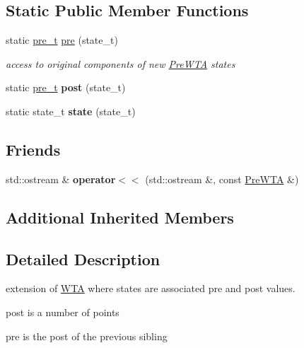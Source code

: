 \subsection*{Static Public Member Functions}
\begin{DoxyCompactItemize}
\item 
static \mbox{\hyperlink{group__general_ga092fe8b972dfa977c2a0886720a7731e}{pre\+\_\+t}} \mbox{\hyperlink{group__schemata_gaab30a1faaa381ecfabd705a8c12d179b}{pre}} (state\+\_\+t)
\begin{DoxyCompactList}\small\item\em access to original components of new \mbox{\hyperlink{classPreWTA}{Pre\+W\+TA}} states \end{DoxyCompactList}\item 
static \mbox{\hyperlink{group__general_ga092fe8b972dfa977c2a0886720a7731e}{pre\+\_\+t}} {\bfseries post} (state\+\_\+t)
\item 
static state\+\_\+t {\bfseries state} (state\+\_\+t)
\end{DoxyCompactItemize}
\subsection*{Friends}
\begin{DoxyCompactItemize}
\item 
\mbox{\label{classPreWTA_ad81a5d6ce9870bd4efa5e970004bafd3}} 
std\+::ostream \& {\bfseries operator$<$$<$} (std\+::ostream \&, const \mbox{\hyperlink{classPreWTA}{Pre\+W\+TA}} \&)
\end{DoxyCompactItemize}
\subsection*{Additional Inherited Members}


\subsection{Detailed Description}
extension of \mbox{\hyperlink{classWTA}{W\+TA}} where states are associated pre and post values. 


\begin{DoxyItemize}
\item post is a number of points
\item pre is the post of the previous sibling
\end{DoxyItemize}

